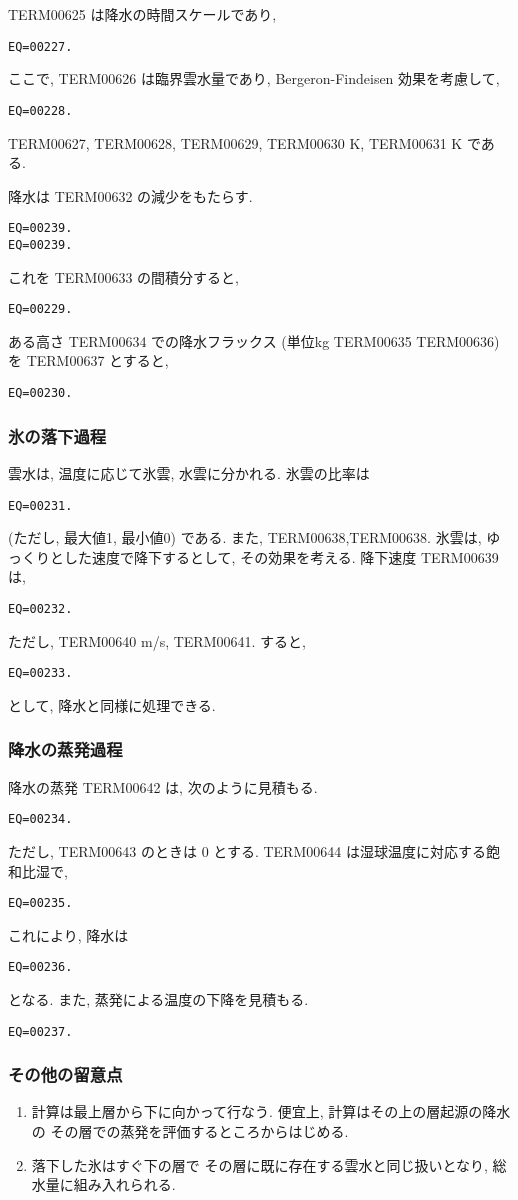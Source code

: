 TERM00625 は降水の時間スケールであり,
\begin{verbatim}
EQ=00227.
\end{verbatim}
ここで, TERM00626 は臨界雲水量であり,
Bergeron-Findeisen 効果を考慮して,
\begin{verbatim}
EQ=00228.
\end{verbatim}
TERM00627, TERM00628, TERM00629, 
TERM00630 K, TERM00631 K である.

降水は TERM00632 の減少をもたらす.
\begin{verbatim}
EQ=00239.
EQ=00239.
\end{verbatim}
これを TERM00633 の間積分すると,
\begin{verbatim}
EQ=00229.
\end{verbatim}

ある高さ TERM00634 での降水フラックス
(単位kg TERM00635 TERM00636)を TERM00637 とすると,
\begin{verbatim}
EQ=00230.
\end{verbatim}

\subsubsection{氷の落下過程}

雲水は, 温度に応じて氷雲, 水雲に分かれる.
氷雲の比率は
\begin{verbatim}
EQ=00231.
\end{verbatim}
(ただし, 最大値1, 最小値0) である. また,
TERM00638,TERM00638.
氷雲は, ゆっくりとした速度で降下するとして, 
その効果を考える. 降下速度 TERM00639 は,
\begin{verbatim}
EQ=00232.
\end{verbatim}
ただし, TERM00640 m/s, TERM00641.
すると, 
\begin{verbatim}
EQ=00233.
\end{verbatim}
として, 降水と同様に処理できる.

\subsubsection{降水の蒸発過程}

降水の蒸発 TERM00642 は, 次のように見積もる.

\begin{verbatim}
EQ=00234.
\end{verbatim}
ただし, TERM00643 のときは 0 とする.
TERM00644 は湿球温度に対応する飽和比湿で,
\begin{verbatim}
EQ=00235.
\end{verbatim}
%
これにより, 降水は
\begin{verbatim}
EQ=00236.
\end{verbatim}
となる. また, 蒸発による温度の下降を見積もる.
\begin{verbatim}
EQ=00237.
\end{verbatim}

\subsubsection{その他の留意点}

\begin{enumerate}
\item 計算は最上層から下に向かって行なう.
      便宜上, 計算はその上の層起源の降水の
      その層での蒸発を評価するところからはじめる.
\item 落下した氷はすぐ下の層で
      その層に既に存在する雲水と同じ扱いとなり,
      総水量に組み入れられる.
\end{enumerate}



